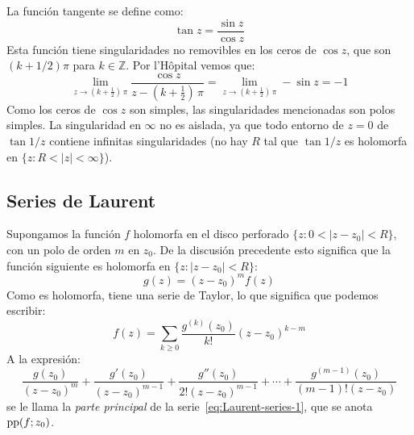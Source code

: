   La función tangente se define como:
  \begin{equation*}
    \tan z
      = \frac{\sin z}{\cos z}
  \end{equation*}
  Esta función tiene singularidades no removibles
  en los ceros de \(\cos z\),
  que son \((k + 1 / 2) \pi\) para \(k \in \mathbb{Z}\).
  Por l'Hôpital vemos que:%
  \begin{equation*}
    \lim_{z \rightarrow \left( k + \frac{1}{2} \right) \, \pi}
       \frac{\cos z}{z - \left( k + \frac{1}{2} \right) \, \pi}
      = \lim_{z \rightarrow
	    \left( k + \frac{1}{2} \right) \, \pi} - \sin z
      = -1
  \end{equation*}
  Como los ceros de \(\cos z\) son simples,
  las singularidades mencionadas son polos simples.
  La singularidad en \(\infty\) no es aislada,
  ya que todo entorno de \(z = 0\) de \(\tan 1 / z\)
  contiene infinitas singularidades
  (no hay \(R\) tal que \(\tan 1 / z\) es holomorfa
   en \(\{ z \colon R < \lvert z \rvert < \infty \}\)).

\subsection{Series de Laurent}
\label{sec:Laurent-series}

  Supongamos la función \(f\) holomorfa en el disco perforado
  \(\{ z \colon 0 < \lvert z - z_0 \rvert < R \}\),
  con un polo de orden \(m\) en \(z_0\).
  De la discusión precedente esto significa que la función siguiente
  es holomorfa
  en \(\{ z \colon \lvert z - z_0 \rvert < R \}\):
  \begin{equation*}
    g(z)
      = (z - z_0)^m f(z)
  \end{equation*}
  Como es holomorfa,
  tiene una serie de Taylor,
  lo que significa que podemos escribir:
  \begin{equation}
    \label{eq:Laurent-series-1}
    f(z)
      = \sum_{k \ge 0} \frac{g^{(k)}(z_0)}{k!} (z - z_0)^{k - m}
  \end{equation}
  A la expresión:
  \begin{equation}
    \label{eq:Laurent-series-pp}
    \frac{g(z_0)}{(z - z_0)^m}
      + \frac{g'(z_0)}{(z - z_0)^{m - 1}}
      + \frac{g''(z_0)}{2! (z - z_0)^{m - 1}}
      + \dotsb
      + \frac{g^{(m - 1)}(z_0)}{(m - 1)! (z - z_0)}
  \end{equation}
  se le llama la \emph{parte principal}%
  de la serie~\eqref{eq:Laurent-series-1},
  que se anota \(\operatorname{pp}(f; z_0)\).

